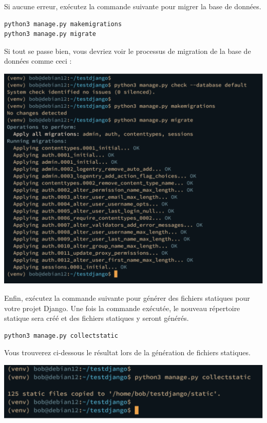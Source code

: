\documentclass{article}
\begin{document}
Si aucune erreur, exécutez la commande suivante pour migrer la base de données.

\begin{verbatim}
python3 manage.py makemigrations
python3 manage.py migrate
\end{verbatim}

Si tout se passe bien, vous devriez voir le processus de migration de la base de données comme ceci :

\begin{center}
\includegraphics[width=15cm]{images/image13.png}
\end{center}

Enfin, exécutez la commande suivante pour générer des fichiers statiques pour votre projet Django. Une fois la commande exécutée, le nouveau répertoire statique sera créé et des fichiers statiques y seront générés.


\begin{verbatim}
python3 manage.py collectstatic
\end{verbatim}

Vous trouverez ci-dessous le résultat lors de la génération de fichiers statiques.

\begin{center}
\includegraphics[width=15cm]{images/image14.png}
\end{center}
\end{document}
